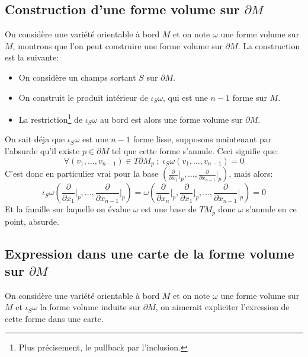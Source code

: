    \subsection*{Construction d'une forme volume sur $\partial M$}
      On considère une variété orientable à bord $M$ et on note $\omega$ une forme volume sur $M$, montrons que l'on peut construire une forme volume sur $\partial M$. La construction est la suivante:
      \begin{itemize}
         \item On considère un champs sortant $S$ sur $\partial M$.
         \item On construit le produit intérieur de $\iota_S\omega$, qui est une $n-1$ forme sur $M$.
         \item La restriction\footnote{Plus précisement, le pullback par l'inclusion.}  de $\iota_S\omega$ au bord est alors une forme volume sur $\partial M$.
      \end{itemize}
      On sait déja que $\iota_S\omega$ est une $n-1$ forme lisse, supposons maintenant par l'absurde qu'il existe $p \in \partial M$ tel que cette forme s’annule. Ceci signifie que:
      $$
         \forall (v_1, \ldots, v_{n-1}) \in T\partial M_p \; ; \; \iota_S\omega(v_1, \ldots, v_{n-1}) = 0
      $$
      C'est donc en particulier vrai pour la base $(\frac{\partial}{\partial x_1}\big|_p, \ldots, \frac{\partial}{\partial x_{n-1}}\big|_p)$, mais alors:
      $$
      \iota_S\omega\left(\frac{\partial}{\partial x_1}\bigg|_p, \ldots, \frac{\partial}{\partial x_{n-1}}\bigg|_p\right) = \omega\left(\frac{\partial}{\partial x_n}\bigg|_p,\frac{\partial}{\partial x_1}\bigg|_p, \ldots, \frac{\partial}{\partial x_{n-1}}\bigg|_p\right) =0
      $$
      Et la famille sur laquelle on évalue $\omega$ est une base de $TM_p$ donc $\omega$ s'annule en ce point, absurde.
   \subsection*{Expression dans une carte de la forme volume sur $\partial M$}
      On considère une variété orientable à bord $M$ et on note $\omega$ une forme volume sur $M$ et $\iota_S\omega$ la forme volume induite sur $\partial M$, on aimerait expliciter l'exression de cette forme dans une carte.


\pagebreak

